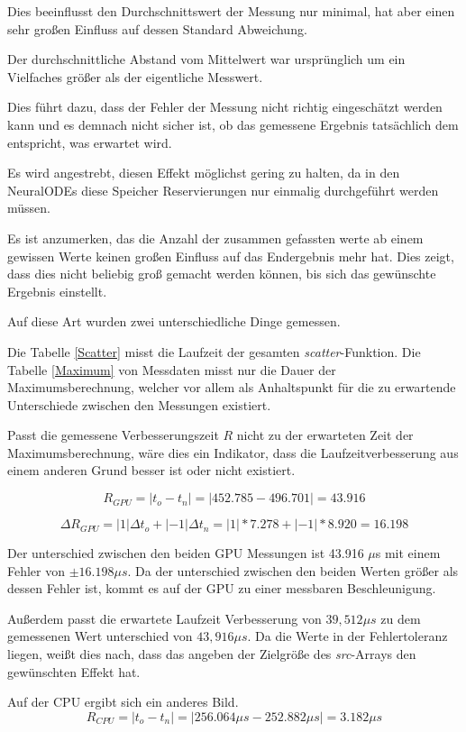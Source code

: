 Dies beeinflusst den Durchschnittswert der Messung nur minimal, hat aber einen sehr großen Einfluss auf dessen Standard Abweichung.

Der durchschnittliche Abstand vom Mittelwert war ursprünglich
um ein Vielfaches größer als der eigentliche Messwert.

Dies führt dazu, dass der Fehler der Messung nicht richtig eingeschätzt werden kann und es demnach nicht sicher ist, ob das gemessene Ergebnis tatsächlich dem entspricht, was erwartet wird.

Es wird angestrebt, diesen Effekt möglichst gering zu halten, da in den NeuralODEs diese Speicher Reservierungen nur einmalig durchgeführt werden müssen.

Es ist anzumerken, das die Anzahl der zusammen gefassten werte ab einem gewissen Werte keinen großen Einfluss auf das Endergebnis mehr hat.
Dies zeigt, dass dies nicht beliebig groß gemacht werden können, bis sich das gewünschte Ergebnis einstellt.

Auf diese Art wurden zwei unterschiedliche Dinge gemessen.

Die Tabelle \ref{Scatter} misst die Laufzeit der gesamten \textit{scatter}-Funktion.
Die Tabelle \ref{Maximum} von Messdaten misst nur die Dauer der Maximumsberechnung, welcher vor allem als Anhaltspunkt für die zu erwartende Unterschiede zwischen den Messungen 
existiert.

Passt die gemessene Verbesserungszeit $R$ nicht zu der erwarteten Zeit der Maximumsberechnung, wäre dies ein Indikator, dass die Laufzeitverbesserung aus einem anderen Grund besser ist oder nicht existiert.

$$
 R_{GPU} = | t_o - t_n | = | 452.785 - 496.701 | = 43.916
$$

$$
 \Delta R_{GPU} = | 1 | \Delta t_o + |-1| \Delta t_n = | 1| * 7.278 +  |-1| * 8.920 = 16.198
$$

Der unterschied zwischen den beiden GPU Messungen ist 43.916 $\mu$s mit einem Fehler von $\pm 16.198 \mu s$.
Da der unterschied zwischen den beiden Werten größer als dessen Fehler ist, kommt es auf der GPU zu einer messbaren Beschleunigung.

Außerdem passt die erwartete Laufzeit Verbesserung von $39,512 \mu s$ zu dem gemessenen Wert unterschied von $43,916 \mu s$.
Da die Werte in der Fehlertoleranz liegen, weißt dies nach, dass das angeben der Zielgröße des \textit{src}-Arrays den gewünschten Effekt hat.

Auf der CPU ergibt sich ein anderes Bild.
$$
R_{CPU} = |t_o - t_n| = | 256.064 \mu s - 252.882 \mu s | =  3.182 \mu s
$$

